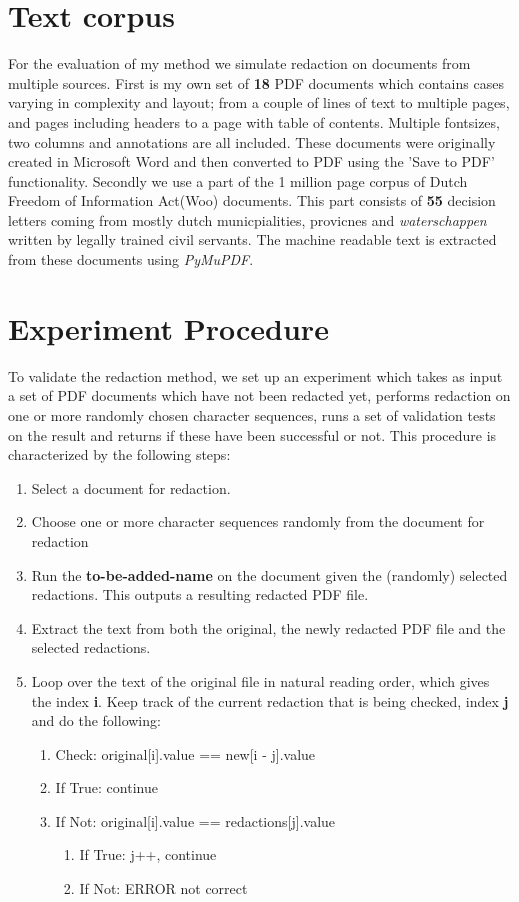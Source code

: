 \section{Text corpus}
For the evaluation of my method we simulate redaction on documents from multiple sources. First is my own set of \textbf{18} PDF documents which contains cases varying in complexity and layout; from a couple of lines of text to multiple pages, and pages including headers to a page with table of contents. Multiple fontsizes, two columns and annotations are all included. These documents were originally created in Microsoft Word and then converted to PDF using the 'Save to PDF' functionality. Secondly we use a part of the 1 million page corpus of Dutch Freedom of Information Act(Woo) documents. This part consists of \textbf{55} decision letters coming from mostly dutch municpialities, provicnes and \textit{waterschappen} written  by legally trained civil servants. The machine readable text is extracted from these documents using \textit{PyMuPDF}.

\section{Experiment Procedure}
To validate the redaction method, we set up an experiment which takes as input a set of PDF documents which have not been redacted yet, performs redaction on one or more randomly chosen character sequences, runs a set of validation tests on the result and returns if these have been successful or not. This procedure is characterized by the following steps:
\begin{enumerate}
    \item Select a document for redaction.
    \item Choose one or more character sequences randomly from the document for redaction
    \item Run the \textbf{to-be-added-name} on the document given the (randomly) selected redactions. This outputs a resulting redacted PDF file.
    \item Extract the text from both the original, the newly redacted PDF file and the selected redactions.
    \item Loop over the text of the original file in natural reading order, which gives the index \textbf{i}. Keep track of the current redaction that is being checked, index \textbf{j} and do the following:
        \begin{enumerate}
            \item Check: original[i].value == new[i - j].value
            \item If True: continue
            \item If Not: original[i].value == redactions[j].value
                \begin{enumerate}
                    \item If True: j++, continue
                    \item If Not: ERROR not correct 
                \end{enumerate}
        \end{enumerate}
\end{enumerate}

